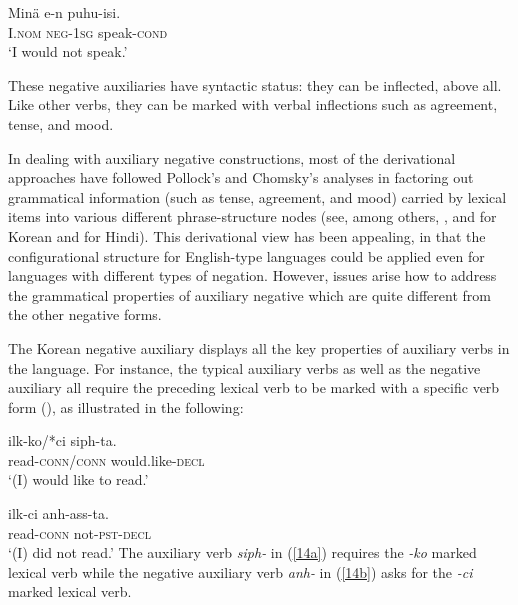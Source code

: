 \documentclass[output=paper
                ,modfonts
                		,nonflat
	        ,collection
	        ,collectionchapter
	        ,collectiontoclongg
 	        ,biblatex
                ,babelshorthands
                ,newtxmath
                ,draftmode
                ,colorlinks, citecolor=brown
]{./langsci/langscibook}
\begin{document}
{\begin{exe}
\begin{xlist}
\begin{exe}
\begin{xlist}
\ea
\gll Min\"{a} e-n puhu-isi. \\
     I.\textsc{nom} \textsc{neg}-\textsc{1sg} speak-\textsc{cond} \\
\glt `I would not speak.'
\z

\noindent
These negative auxiliaries have syntactic status: they can be
inflected, above all. Like other verbs, they can be marked
with verbal inflections such as agreement, tense, and mood.

In dealing with auxiliary negative constructions,
most of the derivational approaches have
followed Pollock's and Chomsky's analyses in factoring out grammatical
information (such as tense, agreement, and mood) carried by lexical items into various different phrase-structure nodes (see, among others, \citet{Hagstrom:02}, and \citet{Han:07} for Korean and \citet{Vasishth:00} for Hindi).
This derivational view has
been appealing, in that the configurational structure for English-type
languages could be applied even for languages with different types
of negation. However, issues arise how to address the grammatical
properties of auxiliary negative which are quite different from the
other negative forms.
%
%
%
%

%


%
The Korean negative auxiliary displays all the key properties of auxiliary verbs in the language. For instance, the typical auxiliary verbs as
well as the negative auxiliary all require the preceding lexical verb to be marked with a specific verb form (\vform), as illustrated
in the following:

\eal
\ex\label{14a}
\gll ilk-ko/*ci siph-ta. \\
     read-\textsc{conn}/\textsc{conn} would.like-\textsc{decl} \\
\glt `(I) would like to read.'

\ex\label{14b}
\gll ilk-ci anh-ass-ta. \\
     read-\textsc{conn} not-\textsc{pst}-\textsc{decl} \\
\glt `(I) did not read.'
\zl
\noindent
The auxiliary verb \textit{siph-} in (\ref{14a}) requires the
\textit{-ko} marked lexical verb while the negative auxiliary
 verb \textit{anh-} in (\ref{14b}) asks for the \textit{-ci} marked lexical verb.


\end{xlist}
\end{exe}
\end{xlist}
\end{exe}}
\end{document}
